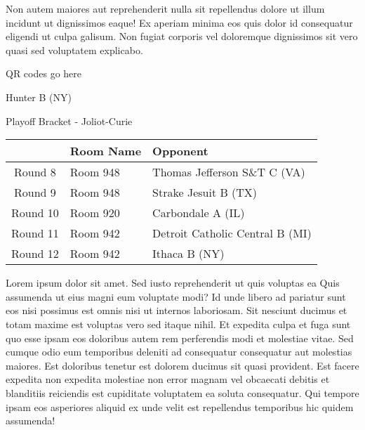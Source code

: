 \documentclass{article}%
\begin{document}
\newline%
Non autem maiores aut reprehenderit nulla sit repellendus dolore ut illum incidunt ut dignissimos eaque! Ex aperiam minima eos quis dolor id consequatur eligendi ut culpa galisum. Non fugiat corporis vel doloremque dignissimos sit vero quasi sed voluptatem explicabo.\newline%
\newline%
%
\vspace*{30pt}%
\begin{center}%
\begin{Huge}%
QR codes go here%
\end{Huge}%
\end{center}%
\newpage%
\begin{center}%
\begin{Huge}%
Hunter B (NY)%
\end{Huge}%
\vspace*{8pt}%
\linebreak%
\begin{Large}%
Playoff Bracket {-} Joliot{-}Curie%
\end{Large}%
\end{center}%
\begin{tabularx}{\textwidth}{|c|Y|Y|}%
\hline%
&Room Name&Opponent\\%
\hline%
Round 8&Room 948&Thomas Jefferson S\&T C (VA)\\%
Round 9&Room 948&Strake Jesuit B (TX)\\%
Round 10&Room 920&Carbondale A (IL)\\%
Round 11&Room 942&Detroit Catholic Central B (MI)\\%
Round 12&Room 942&Ithaca B (NY)\\%
\hline%
\end{tabularx}%
\vspace*{8pt}%
\linebreak%
\newline%
\newline%
Lorem ipsum dolor sit amet. Sed iusto reprehenderit ut quis voluptas ea Quis assumenda ut eius magni eum voluptate modi? Id unde libero ad pariatur sunt eos nisi possimus est omnis nisi ut internos laboriosam. Sit nesciunt ducimus et totam maxime est voluptas vero sed itaque nihil. Et expedita culpa et fuga sunt quo esse ipsam eos doloribus autem rem perferendis modi et molestiae vitae.\newline%
\newline%
Sed cumque odio eum temporibus deleniti ad consequatur consequatur aut molestias maiores. Est doloribus tenetur est dolorem ducimus sit quasi provident. Est facere expedita non expedita molestiae non error magnam vel obcaecati debitis et blanditiis reiciendis est cupiditate voluptatem ea soluta consequatur. Qui tempore ipsam eos asperiores aliquid ex unde velit est repellendus temporibus hic quidem assumenda!\newline%
\end{document}
